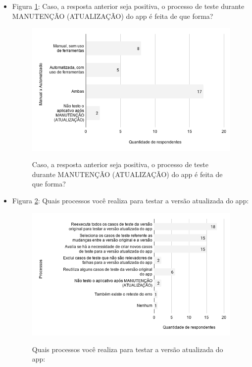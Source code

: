 \begin{itemize}
    
    \item Figura \ref{figure:s_formatestemanutencao}: Caso, a resposta anterior seja positiva, o processo de teste durante MANUTENÇÃO (ATUALIZAÇÃO) do app é feita de que forma?
        \begin{figure}[!htb]
        \centering
        \includegraphics[width=.80\textwidth]{images/s_formatestemanutencao.png}
        \label{figure:s_formatestemanutencao}
        \caption{Caso, a resposta anterior seja positiva, o processo de teste durante MANUTENÇÃO (ATUALIZAÇÃO) do app é feita de que forma?}
        \end{figure}     
    
    
    \item Figura \ref{figure:s_processostestemanutencao}: Quais processos você realiza para testar a versão atualizada do app:
        \begin{figure}[!htb]
        \centering
        \includegraphics[width=.80\textwidth]{images/s_processostestemanutencao.png}
        \label{figure:s_processostestemanutencao}
        \caption{Quais processos você realiza para testar a versão atualizada do app:}
        \end{figure} 
    

\end{itemize}
